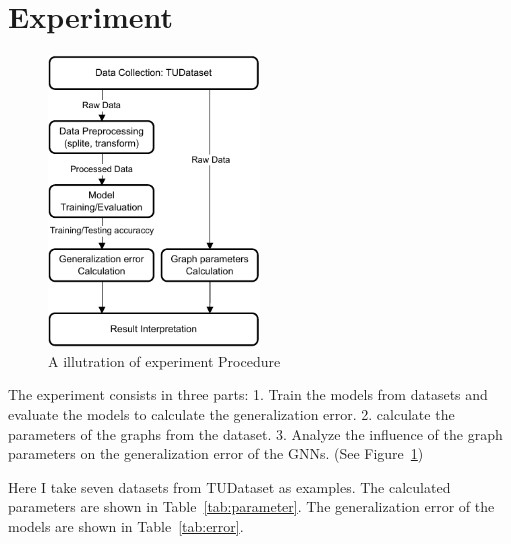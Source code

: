 \documentclass{article}
\begin{document}
\section{Experiment}


\begin{figure}[h]
    \includegraphics[width=0.5\textwidth]{experiment_procedure.pdf}
    \caption{A illutration of experiment Procedure}
    \label{fig:experiment}
\end{figure}

The experiment consists in three parts: 1. Train the models from datasets and evaluate the models to calculate the generalization error. 2. calculate the parameters of the graphs from the dataset. 3. Analyze the influence of the graph parameters on the generalization error of the GNNs. (See Figure~\ref{fig:experiment})

Here I take seven datasets from TUDataset as examples. The calculated parameters are shown in Table~\ref{tab:parameter}. The generalization error of the models are shown in Table~\ref{tab:error}.
\end{document}
